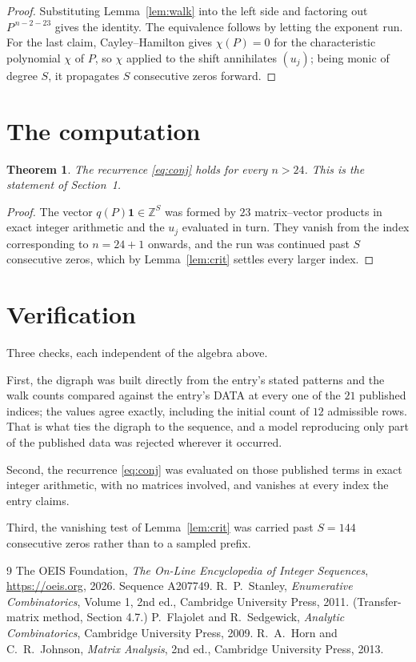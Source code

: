 \documentclass[11pt,a4paper]{article}
\theoremstyle{plain}
\newtheorem{theorem}{Theorem}
\theoremstyle{definition}
\begin{document}
\begin{proof}
Substituting Lemma~\ref{lem:walk} into the left side and factoring out
$P^{\,n-2-23}$ gives the identity. The equivalence follows by letting the exponent
run. For the last claim, Cayley--Hamilton gives $\chi(P)=0$ for the characteristic
polynomial $\chi$ of $P$, so $\chi$ applied to the shift annihilates $(u_j)$; being monic of
degree $S$, it propagates $S$ consecutive zeros forward.
\end{proof}

\section{The computation}

\begin{theorem}
The recurrence \eqref{eq:conj} holds for every $n>24$. This is the statement of
Section~1.
\end{theorem}

\begin{proof}
The vector $q(P)\mathbf{1}\in\mathbb{Z}^{S}$ was formed by $23$ matrix--vector
products in exact integer arithmetic and the $u_j$ evaluated in turn. They vanish from the
index corresponding to $n=24+1$ onwards, and the run was continued past $S$ consecutive
zeros, which by Lemma~\ref{lem:crit} settles every larger index.
\end{proof}

\section{Verification}

Three checks, each independent of the algebra above.

First, the digraph was built directly from the entry's stated patterns and the walk counts
compared against the entry's DATA at every one of the $21$ published indices; the
values agree exactly, including the initial count of $12$ admissible rows. That is
what ties the digraph to the sequence, and a model reproducing only part of the published
data was rejected wherever it occurred.

Second, the recurrence \eqref{eq:conj} was evaluated on those published terms in exact
integer arithmetic, with no matrices involved, and vanishes at every index the entry claims.

Third, the vanishing test of Lemma~\ref{lem:crit} was carried past $S=144$ consecutive
zeros rather than to a sampled prefix.

\begin{thebibliography}{9}
 The OEIS Foundation, \emph{The On-Line Encyclopedia of Integer
Sequences}, \url{https://oeis.org}, 2026. Sequence A207749.
 R.~P.~Stanley, \emph{Enumerative Combinatorics}, Volume 1, 2nd ed.,
Cambridge University Press, 2011. (Transfer-matrix method, Section 4.7.)
 P.~Flajolet and R.~Sedgewick, \emph{Analytic Combinatorics}, Cambridge
University Press, 2009.
 R.~A.~Horn and C.~R.~Johnson, \emph{Matrix Analysis}, 2nd ed., Cambridge
University Press, 2013.
\end{thebibliography}
\end{document}
